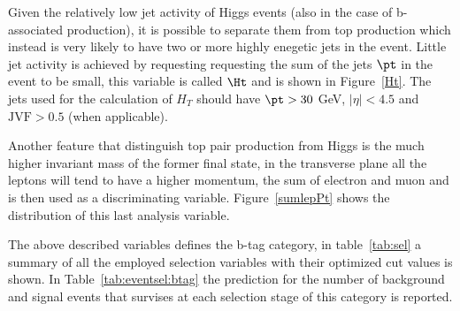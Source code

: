 Given the relatively low jet activity of Higgs events (also in the case of b-associated production), 
it is possible to separate them from
top production which instead is very likely to have two or more highly enegetic jets in the event.
Little jet activity is achieved by requesting requesting the sum of the jets $\pt$ in the event to be small, this variable is called $\Ht$
and is shown in Figure~\ref{Ht}. The jets used for the calculation of $H_T$ should have $\pt > 30 $ GeV, $|\eta| < 4.5$  and
$\text{JVF} > 0.5 $ (when applicable).

Another feature that distinguish top pair production from Higgs is the much higher invariant mass of the former final state,
in the transverse plane all the leptons will tend to have a higher momentum, the sum of electron and muon \pt and \met is then used as
a discriminating variable. Figure~\ref{sumlepPt} shows the distribution of this last analysis variable.

The above described variables defines the b-tag category, in table~\ref{tab:sel} a summary of all the employed selection 
variables with their optimized cut values is shown. In Table~\ref{tab:eventsel:btag}
the prediction for the number of background and signal events that survises at 
each selection stage of this category is reported.

